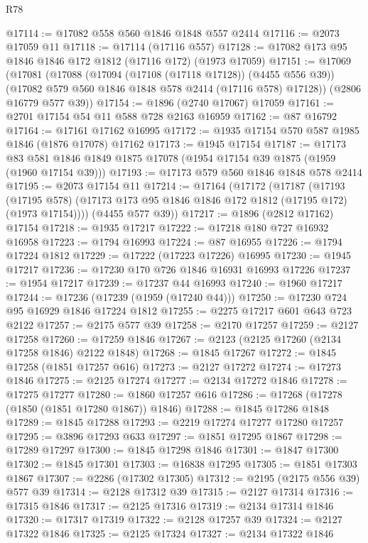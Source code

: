 \begin{lexlean}{R78}
\begin{coremodule}
@17114 := @17082 @558 @560 @1846 @1848 @557 @2414
@17116 := @2073 @17059 @11
@17118 := @17114 (@17116 @557)
@17128 := @17082 @173 @95 @1846 @1846 @172 @1812 (@17116 @172) (@1973 @17059)
@17151 := @17069
    (@17081
      (@17088
        (@17094 (@17108 (@17118 @17128)) (@4455 @556 @39))
        (@17082 @579 @560 @1846 @1848 @578 @2414 (@17116 @578) @17128))
      (@2806 @16779 @577 @39))
@17154 := @1896 (@2740 @17067) @17059
@17161 := @2701 @17154 @54 @11 @588 @728 @2163 @16959
@17162 := @87 @16792
@17164 := @17161 @17162 @16995
@17172 := @1935 @17154 @570 @587 @1985 @1846 (@1876 @17078) @17162
@17173 := @1945 @17154
@17187 := @17173
    @83
    @581
    @1846
    @1849
    @1875
    @17078
    (@1954 @17154 @39 @1875 (@1959 (@1960 @17154 @39)))
@17193 := @17173 @579 @560 @1846 @1848 @578 @2414
@17195 := @2073 @17154 @11
@17214 := @17164
    (@17172
      (@17187
        (@17193
          (@17195 @578)
          (@17173 @173 @95 @1846 @1846 @172 @1812 (@17195 @172) (@1973 @17154))))
      (@4455 @577 @39))
@17217 := @1896 (@2812 @17162) @17154
@17218 := @1935 @17217
@17222 := @17218 @180 @727 @16932 @16958
@17223 := @1794 @16993
@17224 := @87 @16955
@17226 := @1794 @17224 @1812
@17229 := @17222 (@17223 @17226) @16995
@17230 := @1945 @17217
@17236 := @17230 @170 @726 @1846 @16931 @16993 @17226
@17237 := @1954 @17217
@17239 := @17237 @44 @16993
@17240 := @1960 @17217
@17244 := @17236 (@17239 (@1959 (@17240 @44)))
@17250 := @17230 @724 @95 @16929 @1846 @17224 @1812
@17255 := @2275 @17217 @601 @643 @723 @2122
@17257 := @2175 @577 @39
@17258 := @2170 @17257
@17259 := @2127 @17258
@17260 := @17259 @1846
@17267 := @2123 (@2125 @17260 (@2134 @17258 @1846) @2122 @1848)
@17268 := @1845 @17267
@17272 := @1845 @17258 (@1851 @17257 @616)
@17273 := @2127 @17272
@17274 := @17273 @1846
@17275 := @2125 @17274
@17277 := @2134 @17272 @1846
@17278 := @17275 @17277
@17280 := @1860 @17257 @616
@17286 := @17268 (@17278 (@1850 (@1851 @17280 @1867)) @1846)
@17288 := @1845 @17286 @1848
@17289 := @1845 @17288
@17293 := @2219 @17274 @17277 @17280 @17257
@17295 := @3896 @17293 @633
@17297 := @1851 @17295 @1867
@17298 := @17289 @17297
@17300 := @1845 @17298 @1846
@17301 := @1847 @17300
@17302 := @1845 @17301
@17303 := @16838 @17295
@17305 := @1851 @17303 @1867
@17307 := @2286 (@17302 @17305)
@17312 := @2195 (@2175 @556 @39) @577 @39
@17314 := @2128 @17312 @39
@17315 := @2127 @17314
@17316 := @17315 @1846
@17317 := @2125 @17316
@17319 := @2134 @17314 @1846
@17320 := @17317 @17319
@17322 := @2128 @17257 @39
@17324 := @2127 @17322 @1846
@17325 := @2125 @17324
@17327 := @2134 @17322 @1846

\end{coremodule}
\end{lexlean}
